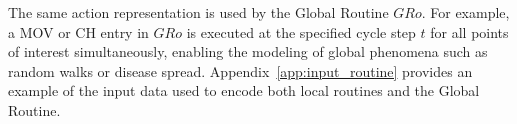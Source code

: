 \documentclass[pdflatex,sn-mathphys-num]{sn-jnl}%
\theoremstyle{thmstyleone}%
\theoremstyle{thmstyletwo}%
\theoremstyle{thmstylethree}%
\begin{document}


The same action representation is used by the Global Routine $GRo$. For example, a MOV or CH entry in $GRo$ is executed at the specified cycle step 
$t$ for all points of interest simultaneously, enabling the modeling of global phenomena such as random walks or disease spread. Appendix~\ref{app:input_routine} provides an example of the input data used to encode both local routines and the Global Routine.

\end{document}
